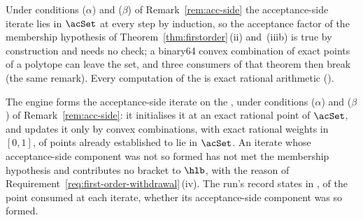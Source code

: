 
Under conditions ($\alpha$) and ($\beta$) of Remark~\ref{rem:acc-side} the
acceptance-side iterate lies in $\acSet$ at every step by induction, so the
acceptance factor of the membership hypothesis of
Theorem~\ref{thm:firstorder}\,(ii) and~(iiib) is true by construction and
needs no check; a binary64 convex combination of exact points of a polytope
can leave the set, and three consumers of that theorem then break (the same
remark). Every computation of the  is exact rational
arithmetic ().

\begin{requirement}\label{req:acceptance-iterate-exact}
The engine forms the acceptance-side iterate on the ,
under conditions ($\alpha$) and ($\beta$) of Remark~\ref{rem:acc-side}: it
initialises it at an exact rational point of $\acSet$, and updates it only by
convex combinations, with exact rational weights in $[0,1]$, of points
already established to lie in $\acSet$. An iterate whose acceptance-side
component was not so formed has not met the membership hypothesis and
contributes no bracket to $\hlb$, with the reason of
Requirement~\ref{req:first-order-withdrawal}\,(iv). The run's record states in
, of the point consumed at each iterate, whether
its acceptance-side component was so formed.
\end{requirement}
